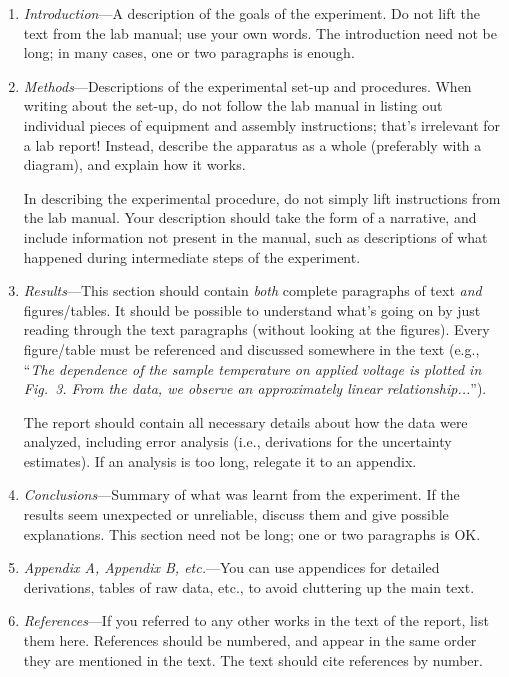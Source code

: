 \documentclass[11pt,a4paper]{article}
\begin{document}
\begin{enumerate}
\item \textit{Introduction}---A description of the goals of the
  experiment.  Do not lift the text from the lab manual; use your own
  words.  The introduction need not be long; in many cases, one or two
  paragraphs is enough.

\item \textit{Methods}---Descriptions of the experimental set-up and
  procedures.  When writing about the set-up, do not follow the lab
  manual in listing out individual pieces of equipment and assembly
  instructions; that's irrelevant for a lab report!  Instead, describe
  the apparatus as a whole (preferably with a diagram), and explain
  how it works.

  In describing the experimental procedure, do not simply lift
  instructions from the lab manual.  Your description should take the
  form of a narrative, and include information not present in the
  manual, such as descriptions of what happened during intermediate
  steps of the experiment.

\item \textit{Results}---This section should contain \textit{both}
  complete paragraphs of text \textit{and} figures/tables.  It should
  be possible to understand what's going on by just reading through
  the text paragraphs (without looking at the figures).  Every
  figure/table must be referenced and discussed somewhere in the text
  (e.g., ``\textit{The dependence of the sample temperature on applied
    voltage is plotted in Fig.~3.  From the data, we observe an
    approximately linear relationship...}'').

  The report should contain all necessary details about how the data
  were analyzed, including error analysis (i.e., derivations for the
  uncertainty estimates).  If an analysis is too long, relegate it to
  an appendix.

\item \textit{Conclusions}---Summary of what was learnt from the
  experiment.  If the results seem unexpected or unreliable, discuss
  them and give possible explanations.  This section need not be long;
  one or two paragraphs is OK.

\item \textit{Appendix A, Appendix B, etc.}---You can use appendices
  for detailed derivations, tables of raw data, etc., to avoid
  cluttering up the main text.

\item \textit{References}---If you referred to any other works in the
  text of the report, list them here.  References should be numbered,
  and appear in the same order they are mentioned in the text.  The
  text should cite references by number.
\end{enumerate}
\end{document}
